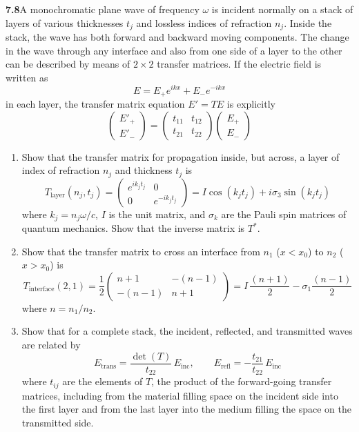 \par\bigskip
\noindent\textbf{7.8}\quad A monochromatic plane wave of frequency $\omega$ is incident normally on a stack of layers of various thicknesses $t_{j}$ and lossless indices of refraction $n_{j}$. Inside the stack, the wave has both forward and backward moving components. The change in the wave through any interface and also from one side of a layer to the other can be described by means of $2\times2$ transfer matrices. If the electric field is written as
\[
E=E_{+}e^{ikx}+E_{-}e^{-ikx}
\]
in each layer, the transfer matrix equation $E'=TE$ is explicitly
\[
\begin{pmatrix}E'_{+}\\ E'_{-}\end{pmatrix}
=\begin{pmatrix}t_{11}&t_{12}\\ t_{21}&t_{22}\end{pmatrix}
\begin{pmatrix}E_{+}\\ E_{-}\end{pmatrix}
\]
\begin{enumerate}
\item[(a)] Show that the transfer matrix for propagation inside, but across, a layer of index of refraction $n_{j}$ and thickness $t_{j}$ is
\[
T_{\mathrm{layer}}(n_{j},t_{j})=
\begin{pmatrix}e^{ik_{j}t_{j}}&0\\ 0&e^{-ik_{j}t_{j}}\end{pmatrix}
=I\cos(k_{j}t_{j})+i\sigma_{3}\sin(k_{j}t_{j})
\]
where $k_{j}=n_{j}\omega/c$, $I$ is the unit matrix, and $\sigma_{k}$ are the Pauli spin matrices of quantum mechanics. Show that the inverse matrix is $T^{*}$.
\item[(b)] Show that the transfer matrix to cross an interface from $n_{1}$ ($x<x_{0}$) to $n_{2}$ ($x>x_{0}$) is
\[
T_{\mathrm{interface}}(2,1)=\frac{1}{2}
\begin{pmatrix}n+1&-(n-1)\\ -(n-1)&n+1\end{pmatrix}
=I\,\frac{(n+1)}{2}-\sigma_{1}\frac{(n-1)}{2}
\]
where $n=n_{1}/n_{2}$.
\item[(c)] Show that for a complete stack, the incident, reflected, and transmitted waves are related by
\[
E_{\mathrm{trans}}=\frac{\det(T)}{t_{22}}\,E_{\mathrm{inc}},\qquad
E_{\mathrm{refl}}=-\frac{t_{21}}{t_{22}}\,E_{\mathrm{inc}}
\]
where $t_{ij}$ are the elements of $T$, the product of the forward-going transfer matrices, including from the material filling space on the incident side into the first layer and from the last layer into the medium filling the space on the transmitted side.
\end{enumerate}
